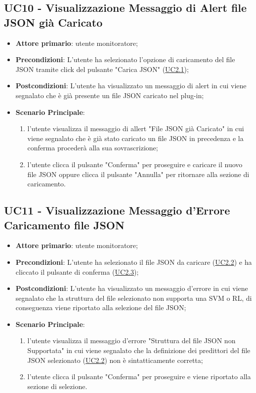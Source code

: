 
	\label{par:UC10}
	\subsection{UC10 - Visualizzazione Messaggio di Alert file JSON già Caricato}
		\begin{itemize}
			\item\textbf{Attore primario}: utente monitoratore;
			\item\textbf{Precondizioni}: L’utente ha selezionato l'opzione di caricamento del file JSON tramite click del pulsante "Carica JSON" (\hyperref[par:UC2.1]{UC2.1});
			\item\textbf{Postcondizioni}: L’utente ha visualizzato un messaggio di alert in cui viene segnalato che è già presente un file JSON caricato nel plug-in; 
			\item\textbf{Scenario Principale}: 
				\begin{enumerate} 
					\item l’utente visualizza il messaggio di allert "File JSON già Caricato" in cui viene segnalato che è già stato caricato un file JSON in precedenza e la conferma procederà alla sua sovrascrizione;
					\item l'utente clicca il pulsante "Conferma" per proseguire e caricare il nuovo file JSON oppure clicca il pulsante "Annulla" per ritornare alla sezione di caricamento.
				\end{enumerate}
		\end{itemize}	


	\label{par:UC11}
	\subsection{UC11 - Visualizzazione Messaggio d'Errore Caricamento file JSON }
		\begin{itemize}
			\item\textbf{Attore primario}: utente monitoratore;
			\item\textbf{Precondizioni}: L’utente ha selezionato il file JSON da caricare (\hyperref[par:UC2.2]{UC2.2}) e ha cliccato il pulsante di conferma (\hyperref[par:UC2.3]{UC2.3});
			\item\textbf{Postcondizioni}: L’utente ha visualizzato un messaggio d'errore in cui viene segnalato che la struttura del file selezionato non supporta una SVM o RL, di conseguenza viene riportato alla selezione del file JSON; 
			\item\textbf{Scenario Principale}: 
				\begin{enumerate} 
					\item l’utente visualizza il messaggio d'errore "Struttura del file JSON non Supportata" in cui viene segnalato che la definizione dei predittori del file JSON selezionato (\hyperref[par:UC2.2]{UC2.2}) non è sintatticamente corretta;
					\item l'utente clicca il pulsante "Conferma" per proseguire e viene riportato alla sezione di selezione.
				\end{enumerate}
		\end{itemize}	

